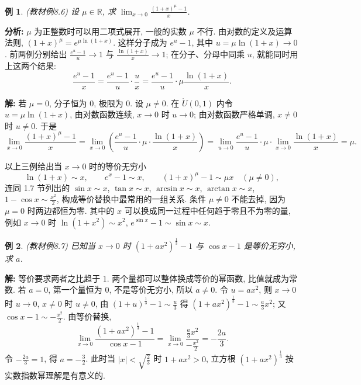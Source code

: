 \documentclass[UTF8,openany]{ctexbook}
\theoremstyle{chinesetextbook}
\newtheorem{example}{例}[section]
\newenvironment{cnsolution}{\par\indent\textbf{解:} \ignorespaces}{\par}
\begin{document}
\begin{example}
\textnormal{(教材例8.6)} 设 $\mu\in\mathbb R$, 求 $\displaystyle\lim_{x\to0}\frac{(1+x)^\mu-1}x$.
\end{example}
\par\indent\textbf{分析:} $\mu$ 为正整数时可以用二项式展开, 一般的实数 $\mu$ 不行. 由对数的定义及运算法则, $(1+x)^\mu=e^{\mu\ln(1+x)}$. 这样分子成为 $e^u-1$, 其中 $u=\mu\ln(1+x)\to0$. 前两例分别给出 $\displaystyle\frac{e^u-1}u\to1$ 与 $\displaystyle\frac{\ln(1+x)}x\to1$; 在分子、分母中同乘 $u$, 就能同时用上这两个结果:
\[
\frac{e^u-1}x=\frac{e^u-1}u\cdot\frac ux=\frac{e^u-1}u\cdot\mu\frac{\ln(1+x)}x.
\]
\begin{cnsolution}
若 $\mu=0$, 分子恒为 $0$, 极限为 $0$. 设 $\mu\ne0$. 在 $\mathring U(0,1)$ 内令 $u=\mu\ln(1+x)$, 由对数函数连续, $x\to0$ 时 $u\to0$; 由对数函数严格单调, $x\ne0$ 时 $u\ne0$. 于是
\[
\lim_{x\to0}\frac{(1+x)^\mu-1}x=\lim_{x\to0}\left(\frac{e^u-1}u\cdot\mu\cdot\frac{\ln(1+x)}x\right)=\lim_{u\to0}\frac{e^u-1}u\cdot\mu\cdot\lim_{x\to0}\frac{\ln(1+x)}x=\mu.
\]
\end{cnsolution}
以上三例给出当 $x\to0$ 时的等价无穷小
\[
\ln(1+x)\sim x,\qquad e^x-1\sim x,\qquad(1+x)^\mu-1\sim\mu x\quad(\mu\ne0),
\]
连同 1.7 节列出的 $\sin x\sim x$, $\tan x\sim x$, $\arcsin x\sim x$, $\arctan x\sim x$, $\displaystyle1-\cos x\sim\frac{x^2}2$, 构成等价替换中最常用的一组关系. 条件 $\mu\ne0$ 不能去掉, 因为 $\mu=0$ 时两边都恒为零. 其中的 $x$ 可以换成同一过程中任何趋于零且不为零的量, 例如 $x\to0$ 时 $\ln(1+x^2)\sim x^2$, $e^{\sin x}-1\sim\sin x\sim x$.
\begin{example}
\textnormal{(教材例8.7)} 已知当 $x\to0$ 时 $(1+ax^2)^{\frac13}-1$ 与 $\cos x-1$ 是等价无穷小, 求 $a$.
\end{example}
\begin{cnsolution}
等价要求两者之比趋于 $1$. 两个量都可以整体换成等价的幂函数, 比值就成为常数. 若 $a=0$, 第一个量恒为 $0$, 不是等价无穷小, 所以 $a\ne0$. 令 $u=ax^2$, 则 $x\to0$ 时 $u\to0$, $x\ne0$ 时 $u\ne0$, 由 $\displaystyle(1+u)^{\frac13}-1\sim\frac u3$ 得 $\displaystyle(1+ax^2)^{\frac13}-1\sim\frac a3x^2$; 又 $\displaystyle\cos x-1\sim-\frac{x^2}2$. 由等价替换,
\[
\lim_{x\to0}\frac{(1+ax^2)^{\frac13}-1}{\cos x-1}=\lim_{x\to0}\frac{\frac a3x^2}{-\frac{x^2}2}=-\frac{2a}3.
\]
令 $\displaystyle-\frac{2a}3=1$, 得 $\displaystyle a=-\frac32$. 此时当 $\displaystyle|x|<\sqrt{\frac23}$ 时 $1+ax^2>0$, 立方根 $(1+ax^2)^{\frac13}$ 按实数指数幂理解是有意义的.
\end{cnsolution}
\end{document}
